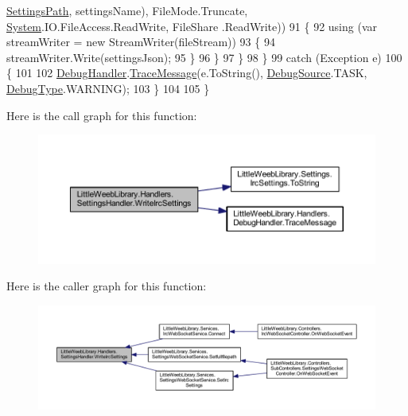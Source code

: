 \begin{DoxyCode}
      \mbox{\hyperlink{class_little_weeb_library_1_1_handlers_1_1_settings_handler_a2e309fc6b949f0bb7e7ace8c2017be7f}{SettingsPath}}, settingsName), FileMode.Truncate, \mbox{\hyperlink{namespace_system}{System}}.IO.FileAccess.ReadWrite, FileShare
      .ReadWrite))
91                     \{
92                         \textcolor{keyword}{using} (var streamWriter = \textcolor{keyword}{new} StreamWriter(fileStream))
93                         \{
94                             streamWriter.Write(settingsJson);
95                         \}
96                     \}
97                 \}
98             \}
99             \textcolor{keywordflow}{catch} (Exception e)
100             \{
101 
102                 \mbox{\hyperlink{class_little_weeb_library_1_1_handlers_1_1_settings_handler_a80da61f3a3fcbb5f9ac6057591a98acf}{DebugHandler}}.\mbox{\hyperlink{interface_little_weeb_library_1_1_handlers_1_1_i_debug_handler_a2e405bc3492e683cd3702fae125221bc}{TraceMessage}}(e.ToString(), 
      \mbox{\hyperlink{namespace_little_weeb_library_1_1_handlers_a2a6ca0775121c9c503d58aa254d292be}{DebugSource}}.TASK, \mbox{\hyperlink{namespace_little_weeb_library_1_1_handlers_ab66019ed40462876ec4e61bb3ccb0a62}{DebugType}}.WARNING);
103             \}
104 
105         \}
\end{DoxyCode}
Here is the call graph for this function\+:\nopagebreak
\begin{figure}[H]
\begin{center}
\leavevmode
\includegraphics[width=350pt]{class_little_weeb_library_1_1_handlers_1_1_settings_handler_ad42462e9e851301c5f5b91663dc3fe24_cgraph}
\end{center}
\end{figure}
Here is the caller graph for this function\+:\nopagebreak
\begin{figure}[H]
\begin{center}
\leavevmode
\includegraphics[width=350pt]{class_little_weeb_library_1_1_handlers_1_1_settings_handler_ad42462e9e851301c5f5b91663dc3fe24_icgraph}
\end{center}
\end{figure}
